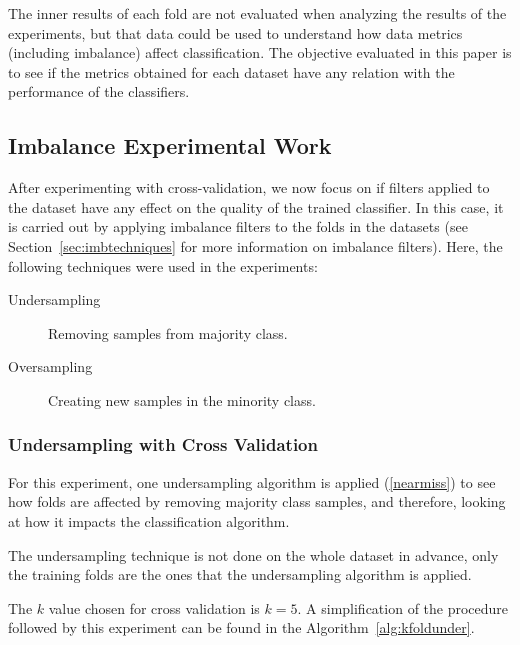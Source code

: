 The inner results of each fold are not evaluated when analyzing the results of 
the experiments, but that data could be used to understand how data metrics 
(including imbalance) affect classification. The objective evaluated in this 
paper is to see if the metrics obtained for each dataset have any relation with 
the performance of the classifiers. 

\subsection{Imbalance Experimental Work}

After experimenting with cross-validation, we now focus on if filters applied 
to the dataset have any effect on the quality of the trained classifier. In this
case, it is carried out by applying imbalance filters to the folds in the 
datasets (see Section~\ref{sec:imbtechniques} for more information on imbalance 
filters). Here, the following techniques were used in the experiments:

\begin{description}
    \item [Undersampling] Removing samples from majority class.
    \item [Oversampling] Creating new samples in the minority class.
\end{description}

\subsubsection{Undersampling with Cross Validation}
\label{sec:kfoldunder}

For this experiment, one undersampling algorithm is applied 
(\ref{nearmiss}) to see how folds are affected by removing majority class 
samples, and therefore, looking at how it impacts the classification algorithm. 

The undersampling technique is not done on the whole dataset in advance, only 
the training folds are the ones that the undersampling algorithm is applied. 

The $k$ value chosen for cross validation is $k=5$. A simplification
of the procedure followed by this experiment can be found in the 
Algorithm~\ref{alg:kfoldunder}.

